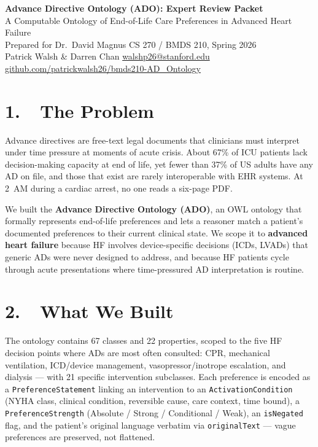 \documentclass[11pt]{article}
\date{}
\newcommand{\onto}[1]{\texttt{\small #1}}
\begin{document}
\begin{center}
{\Large\bfseries Advance Directive Ontology (ADO): Expert Review Packet}\\[0.3em]
{\small A Computable Ontology of End-of-Life Care Preferences in Advanced Heart Failure}\\[0.4em]
{\small Prepared for Dr.\ David Magnus \textbar{} CS 270 / BMDS 210, Spring 2026}\\[0.1em]
{\small Patrick Walsh \& Darren Chan \textbar{} \href{mailto:walshp26@stanford.edu}{walshp26@stanford.edu} \textbar{} \href{https://github.com/patrickwalsh26/bmds210-AD_Ontology}{github.com/patrickwalsh26/bmds210-AD\_Ontology}}
\end{center}

\section*{1.\ \ The Problem}

Advance directives are free-text legal documents that clinicians must interpret under time pressure at moments of acute crisis. About 67\% of ICU patients lack decision-making capacity at end of life, yet fewer than 37\% of US adults have any AD on file, and those that exist are rarely interoperable with EHR systems. At 2~AM during a cardiac arrest, no one reads a six-page PDF.

We built the \textbf{Advance Directive Ontology (ADO)}, an OWL ontology that formally represents end-of-life preferences and lets a reasoner match a patient's documented preferences to their current clinical state. We scope it to \textbf{advanced heart failure} because HF involves device-specific decisions (ICDs, LVADs) that generic ADs were never designed to address, and because HF patients cycle through acute presentations where time-pressured AD interpretation is routine.

\section*{2.\ \ What We Built}

The ontology contains 67 classes and 22 properties, scoped to the five HF decision points where ADs are most often consulted: CPR, mechanical ventilation, ICD/device management, vasopressor/inotrope escalation, and dialysis --- with 21 specific intervention subclasses. Each preference is encoded as a \onto{PreferenceStatement} linking an intervention to an \onto{ActivationCondition} (NYHA class, clinical condition, reversible cause, care context, time bound), a \onto{PreferenceStrength} (Absolute / Strong / Conditional / Weak), an \onto{isNegated} flag, and the patient's original language verbatim via \onto{originalText} --- vague preferences are preserved, not flattened.
\end{document}
